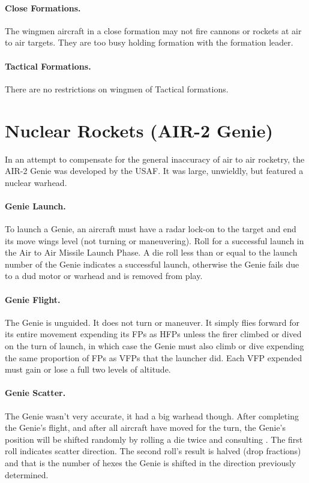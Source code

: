 \begin{advancedrules}
\paragraph{Close Formations.} The wingmen aircraft in a close formation may not fire cannons or rockets at air to air targets. They are too busy holding formation with the formation leader.

\paragraph{Tactical Formations.} There are no restrictions on wingmen of Tactical formations.


\section{Nuclear Rockets (AIR-2 Genie)}
\label{rule:air-to-air-nuclear-rockets}
\label{rule:genie}


In an attempt to compensate for the general inaccuracy of air to air rocketry, the AIR-2 Genie was developed by the USAF. It was large, unwieldly, but featured a nuclear warhead.

\paragraph{Genie Launch.} To launch a Genie, an aircraft must have a radar lock-on to the target and end its move wings level (not turning or maneuvering). Roll for a successful launch in the Air to Air Missile Launch Phase. A die roll less than or equal to the launch number of the Genie indicates a successful launch, otherwise the Genie fails due to a dud motor or warhead and is removed from play.

\paragraph{Genie Flight.} The Genie is unguided. It does not turn or maneuver. It simply flies forward for its entire movement expending its FPs as HFPs unless the firer climbed or dived on the turn of launch, in which case the Genie must also climb or dive expending the same proportion of FPs as VFPs that the launcher did. Each VFP expended must gain or lose a full two levels of altitude.

\paragraph{Genie Scatter.} The Genie wasn't very accurate, it had a big warhead though. After completing the Genie's flight, and after all aircraft have moved for the turn, the Genie’s position will be shifted randomly by rolling a die twice and consulting . The first roll indicates scatter direction. The second roll's result is halved (drop fractions) and that is the number of hexes the Genie is shifted in the direction previously determined. 


\end{advancedrules}
